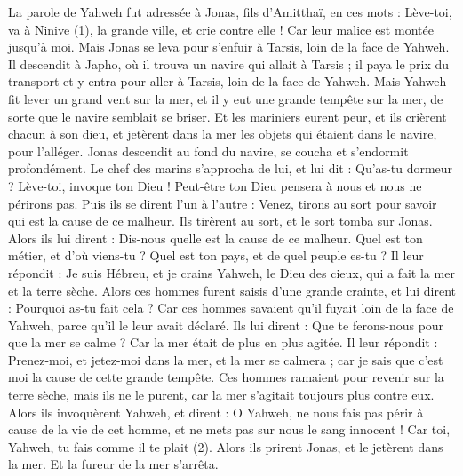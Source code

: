 \BFont
\begin{multicols}{2}
\VerseOne{}La parole de Yahweh fut adressée à Jonas, fils d'Amitthaï, en ces mots :
Lève-toi, va à Ninive (1), la grande ville, et crie contre elle ! Car leur malice est montée jusqu'à moi.
Mais Jonas se leva pour s'enfuir à Tarsis, loin de la face de Yahweh. Il descendit à Japho, où il trouva un navire qui allait à Tarsis ; il paya le prix du transport et y entra pour aller à Tarsis, loin de la face de Yahweh.
Mais Yahweh fit lever un grand vent sur la mer, et il y eut une grande tempête sur la mer, de sorte que le navire semblait se briser.
Et les mariniers eurent peur, et ils crièrent chacun à son dieu, et jetèrent dans la mer les objets qui étaient dans le navire, pour l’alléger. Jonas descendit au fond du navire, se coucha et s’endormit profondément.
Le chef des marins s'approcha de lui, et lui dit : Qu’as-tu dormeur ? Lève-toi, invoque ton Dieu ! Peut-être ton Dieu pensera à nous et nous ne périrons pas.
Puis ils se dirent l'un à l'autre : Venez, tirons au sort pour savoir qui est la cause de ce malheur. Ils tirèrent au sort, et le sort tomba sur Jonas.
Alors ils lui dirent : Dis-nous quelle est la cause de ce malheur. Quel est ton métier, et d'où viens-tu ? Quel est ton pays, et de quel peuple es-tu ?
Il leur répondit : Je suis Hébreu, et je crains Yahweh, le Dieu des cieux, qui a fait la mer et la terre sèche.
Alors ces hommes furent saisis d'une grande crainte, et lui dirent : Pourquoi as-tu fait cela ? Car ces hommes savaient qu’il fuyait loin de la face de Yahweh, parce qu'il le leur avait déclaré.
Ils lui dirent : Que te ferons-nous pour que la mer se calme ? Car la mer était de plus en plus agitée.
Il leur répondit : Prenez-moi, et jetez-moi dans la mer, et la mer se calmera ; car je sais que c’est moi la cause de cette grande tempête.
Ces hommes ramaient pour revenir sur la terre sèche, mais ils ne le purent, car la mer s'agitait toujours plus contre eux.
Alors ils invoquèrent Yahweh, et dirent : O Yahweh, ne nous fais pas périr à cause de la vie de cet homme, et ne mets pas sur nous le sang innocent ! Car toi, Yahweh, tu fais comme il te plait (2).
Alors ils prirent Jonas, et le jetèrent dans la mer. Et la fureur de la mer s'arrêta.

\end{multicols}
